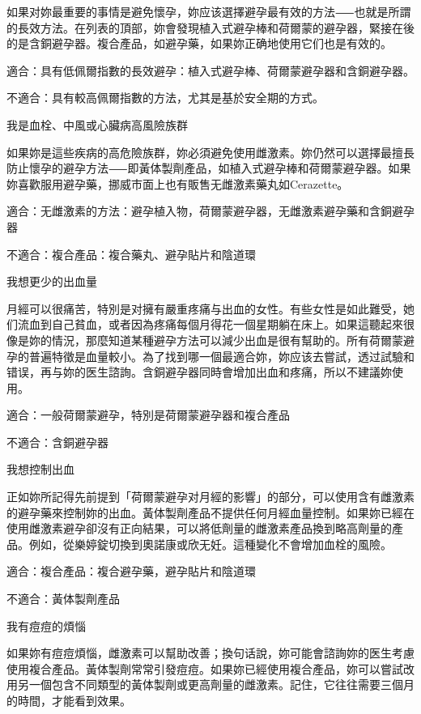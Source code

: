 \documentclass[12pt,UTF8]{ctexbook}
\begin{document}
如果对妳最重要的事情是避免懷孕，妳应该選擇避孕最有效的方法⸺也就是所謂的長效方法。在列表的頂部，妳會發現植入式避孕棒和荷爾蒙的避孕器，緊接在後的是含銅避孕器。複合產品，如避孕藥，如果妳正确地使用它们也是有效的。

適合：具有低佩爾指數的長效避孕：植入式避孕棒、荷爾蒙避孕器和含銅避孕器。

不適合：具有較高佩爾指數的方法，尤其是基於安全期的方式。





我是血栓、中風或心臟病高風險族群


如果妳是這些疾病的高危險族群，妳必須避免使用雌激素。妳仍然可以選擇最擅長防止懷孕的避孕方法⸺即黃体製劑產品，如植入式避孕棒和荷爾蒙避孕器。如果妳喜歡服用避孕藥，挪威市面上也有販售无雌激素藥丸如Cerazette。

適合：无雌激素的方法：避孕植入物，荷爾蒙避孕器，无雌激素避孕藥和含銅避孕器

不適合：複合產品：複合藥丸、避孕貼片和陰道環





我想更少的出血量


月經可以很痛苦，特別是对擁有嚴重疼痛与出血的女性。有些女性是如此難受，她们流血到自己貧血，或者因為疼痛每個月得花一個星期躺在床上。如果這聽起來很像是妳的情況，那麼知道某種避孕方法可以減少出血是很有幫助的。所有荷爾蒙避孕的普遍特徵是血量較小。為了找到哪一個最適合妳，妳应该去嘗試，透过試驗和错误，再与妳的医生諮詢。含銅避孕器同時會增加出血和疼痛，所以不建議妳使用。

適合：一般荷爾蒙避孕，特別是荷爾蒙避孕器和複合產品

不適合：含銅避孕器





我想控制出血


正如妳所記得先前提到「荷爾蒙避孕对月經的影響」的部分，可以使用含有雌激素的避孕藥來控制妳的出血。黃体製劑產品不提供任何月經血量控制。如果妳已經在使用雌激素避孕卻沒有正向結果，可以將低劑量的雌激素產品換到略高劑量的產品。例如，從樂婷錠切換到奧諾康或欣无妊。這種變化不會增加血栓的風險。

適合：複合產品：複合避孕藥，避孕貼片和陰道環

不適合：黃体製劑產品





我有痘痘的煩惱


如果妳有痘痘煩惱，雌激素可以幫助改善；換句话說，妳可能會諮詢妳的医生考慮使用複合產品。黃体製劑常常引發痘痘。如果妳已經使用複合產品，妳可以嘗試改用另一個包含不同類型的黃体製劑或更高劑量的雌激素。記住，它往往需要三個月的時間，才能看到效果。
\end{document}

